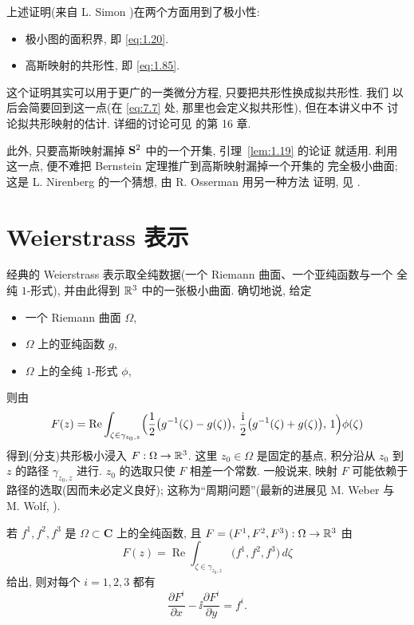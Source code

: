 上述证明(来自 L. Simon \cite{Si5})在两个方面用到了极小性:

\begin{itemize}
  \item 极小图的面积界, 即 \eqref{eq:1.20}.
  \item 高斯映射的共形性, 即 \eqref{eq:1.85}.
\end{itemize}

这个证明其实可以用于更广的一类微分方程, 只要把共形性换成拟共形性. 我们
以后会简要回到这一点(在 \eqref{eq:7.7} 处, 那里也会定义拟共形性), 但在本讲义中不
讨论拟共形映射的估计. 详细的讨论可见 \cite{GiTr} 的第 16 章.

此外, 只要高斯映射漏掉 $\mathbf{S}^2$ 中的一个开集, 引理~\ref{lem:1.19} 的论证
就适用. 利用这一点, 便不难把 Bernstein 定理推广到高斯映射漏掉一个开集的
完全极小曲面; 这是 L. Nirenberg 的一个猜想, 由 R. Osserman 用另一种方法
证明, 见 \cite{Os4}.

\section{Weierstrass 表示}
\label{sec:1.6}

经典的 Weierstrass 表示取全纯数据(一个 Riemann 曲面、一个亚纯函数与一个
全纯 $1$-形式), 并由此得到 $\mathbb{R}^3$ 中的一张极小曲面. 确切地说, 给定
\begin{itemize}
  \item 一个 Riemann 曲面 $\Omega$,
  \item $\Omega$ 上的亚纯函数 $g$,
  \item $\Omega$ 上的全纯 $1$-形式 $\phi$,
\end{itemize}
则由
\begin{equation}
F(z)=\operatorname{Re}\int_{\zeta\in\gamma_{z_0,z}}
\Bigl(\frac12\bigl(g^{-1}(\zeta)-g(\zeta)\bigr),\,
      \frac{\mathrm{i}}{2}\bigl(g^{-1}(\zeta)+g(\zeta)\bigr),\,1\Bigr)\phi(\zeta)
\label{eq:1.109}
\end{equation}
得到(分支)共形极小浸入 $F:\Omega\to\mathbb{R}^3$. 这里 $z_0\in\Omega$ 是固定的基点,
积分沿从 $z_0$ 到 $z$ 的路径 $\gamma_{z_0,z}$ 进行. $z_0$ 的选取只使 $F$
相差一个常数. 一般说来, 映射 $F$ 可能依赖于路径的选取(因而未必定义良好);
这称为``周期问题''(最新的进展见 M. Weber 与 M. Wolf, \cite{WeWo2}).

\begin{lemma}
\label{lem:1.22}
若 $f^1,f^2,f^3$ 是 $\Omega\subset\mathbf{C}$ 上的全纯函数, 且
$F=(F^1,F^2,F^3):\Omega\to\mathbb{R}^3$ 由
\begin{equation}
F(z)=\operatorname{Re}\int_{\zeta\in\gamma_{z_0,z}}
\bigl(f^1,f^2,f^3\bigr)\,d\zeta
\label{eq:1.110}
\end{equation}
给出, 则对每个 $i=1,2,3$ 都有
\begin{equation}
\frac{\partial F^i}{\partial x}
 -\ii\frac{\partial F^i}{\partial y}=f^i.
\label{eq:1.111}
\end{equation}
\end{lemma}

